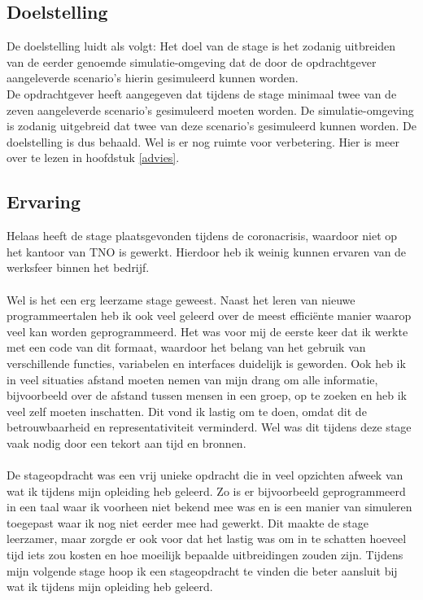 \documentclass[12pt, letterpaper]{article}
\begin{document}
\begin{appendices}
\subsection{Doelstelling}
De doelstelling luidt als volgt: Het doel van de stage is het zodanig uitbreiden van de eerder genoemde simulatie-omgeving dat de door de opdrachtgever aangeleverde scenario’s hierin gesimuleerd kunnen worden. \\
De opdrachtgever heeft aangegeven dat tijdens de stage minimaal twee van de zeven aangeleverde scenario’s gesimuleerd moeten worden. De simulatie-omgeving is zodanig uitgebreid dat twee van deze scenario’s gesimuleerd kunnen worden. De doelstelling is dus behaald. Wel is er nog ruimte voor verbetering. Hier is meer over te lezen in hoofdstuk \ref{advies}.

\subsection{Ervaring}
Helaas heeft de stage plaatsgevonden tijdens de coronacrisis, waardoor niet op het kantoor van TNO is gewerkt. Hierdoor heb ik weinig kunnen ervaren van de werksfeer binnen het bedrijf.
\\ \\
Wel is het een erg leerzame stage geweest. Naast het leren van nieuwe programmeertalen heb ik ook veel geleerd over de meest efficiënte manier waarop veel kan worden geprogrammeerd. Het was voor mij de eerste keer dat ik werkte met een code van dit formaat, waardoor het belang van het gebruik van verschillende functies, variabelen en interfaces duidelijk is geworden. Ook heb ik in veel situaties afstand moeten nemen van mijn drang om alle informatie, bijvoorbeeld over de afstand tussen mensen in een groep, op te zoeken en heb ik veel zelf moeten inschatten. Dit vond ik lastig om te doen, omdat dit de betrouwbaarheid en representativiteit verminderd. Wel was dit tijdens deze stage vaak nodig door een tekort aan tijd en bronnen.  
\\ \\
De stageopdracht was een vrij unieke opdracht die in veel opzichten afweek van wat ik tijdens mijn opleiding heb geleerd. Zo is er bijvoorbeeld geprogrammeerd in een taal waar ik voorheen niet bekend mee was en is een manier van simuleren toegepast waar ik nog niet eerder mee had gewerkt. Dit maakte de stage leerzamer, maar zorgde er ook voor dat het lastig was om in te schatten hoeveel tijd iets zou kosten en hoe moeilijk bepaalde uitbreidingen zouden zijn. Tijdens mijn volgende stage hoop ik een stageopdracht te vinden die beter aansluit bij wat ik tijdens mijn opleiding heb geleerd.


\end{appendices}
\end{document}
